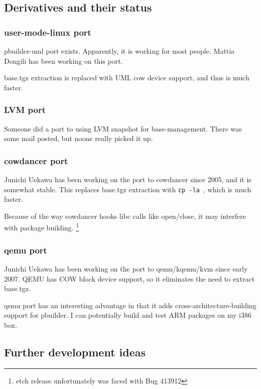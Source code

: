 \documentclass[a4paper]{article}
\begin{document}
\subsection{Derivatives and their status}

\subsubsection{user-mode-linux port}

pbuilder-uml port exists. Apparently, it is working for most people.
Mattia Dongili has been working on this port.

base.tgz extraction is replaced with UML cow device support, and thus is
much faster.

\subsubsection{LVM port}

Someone did a port to using LVM snapshot for base-management.  There was
some mail posted, but noone really picked it up.

\subsubsection{cowdancer port}

Junichi Uekawa has been working on the port to cowdancer since 2005, and
it is somewhat stable.  This replaces base.tgz extraction with
\texttt{cp -la }, which is much faster.

Because of the way cowdancer hooks libc calls like open/close, it may
interfere with package building.  \footnote{etch release unfortunately
was faced with Bug 413912}

\subsubsection{qemu port}

Junichi Uekawa has been working on the port to qemu/kqemu/kvm since
early 2007. QEMU has COW block device support, so it eliminates the need
to extract base.tgz.

qemu port has an interesting advantage in that it adds
cross-architecture-building support for pbuilder. I can potentially
build and test ARM packages on my i386 box.

\subsection{Further development ideas}
\end{document}
